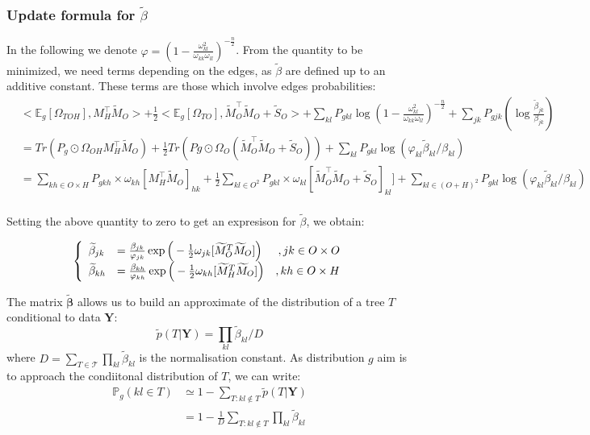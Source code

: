 \documentclass[11pt,a4paper]{article}
\newcommand{\betabf}{\boldsymbol{\beta}}
\newcommand{\Ybf}{\boldsymbol{Y}}
\newcommand{\Esp}{\mathds{E}}
\begin{document}
\subsubsection{Update formula for $\widetilde{\beta}$ }
In the following we denote  $\varphi = \left( 1-\frac{\omega_{kl}^2}{\omega_{kk}\omega_{ll}} \right)^{-\frac{n}{2}}$. From the quantity to be minimized, we need terms depending on the edges, as $\widetilde{\beta}$ are defined up to an additive constant. These terms are those  which involve edges probabilities:
\begin{align*}
& <\Esp_g[\Omega_{TOH}],M_H^\intercal \widetilde{M}_O> + \frac{1}{2}<\Esp_g[\Omega_{TO}],\widetilde{M}_O^\intercal \widetilde{M}_O + \widetilde{S}_O>+\sum _{kl} P_{gkl}  \log\left(1- \frac{ \omega_{kl}^2}{\omega_{kk}\omega_{ll}}\right)^{-\frac{n}{2}}   + \sum_{jk}P_{gjk} \left(\log \frac{\widetilde{\beta}_{jk}}{{\beta}_{jk}}\right)\\
&=Tr(P_g\odot\Omega_{OH}M_H^\intercal \widetilde{M}_O) + \frac{1}{2} Tr(Pg\odot \Omega_O (\widetilde{M}_O^\intercal \widetilde{M}_O + \widetilde{S}_O) ) + \sum_{kl} P_{gkl} \log \left( \varphi_{kl} \widetilde{\beta}_{kl}/\beta_{kl} \right)\\
&= \sum_{kh \in O\times H} P_{gkh} \times \omega_{kh} [M_H^\intercal \widetilde{M}_O]_{hk} + \frac{1}{2} \sum_{kl \in O^2} P_{gkl} \times \omega_{kl} [\widetilde{M}_O^\intercal \widetilde{M}_O + \widetilde{S}_O]_{kl}]+ \sum_{kl \in (O+H)^2} P_{gkl} \log \left( \varphi_{kl} \widetilde{\beta}_{kl}/\beta_{kl} \right) \\
\end{align*}
 
Setting the above quantity to zero to get an expresison for $\widetilde{\beta}$, we obtain:
 
\[\left\{\begin{array}{ll r}
\widetilde{\beta}_{jk} &= \frac{\beta_{jk}}{\varphi_{jk}}\exp\Big(-\frac{1}{2} \omega_{jk}[\widetilde{M}_O^T \widetilde{M}_O]\Big) & ,jk \in O\times O\\
\widetilde{\beta}_{kh} &=\frac{\beta_{kh}}{\varphi_{kh}}\exp\Big(-\frac{1}{2} \omega_{kh}[\widetilde{M}_H^T \widetilde{M}_O]\Big) & ,kh \in O\times H
\end{array}\right.\]
 

The matrix $\widetilde{\betabf}$ allows us to build an approximate of the distribution of a tree $T$ conditional to  data $\Ybf$:
$$\tilde{p}(T|\Ybf) = \prod_{kl} \widetilde{\beta}_{kl} \big/ D $$
where $D = \sum_{T\in \mathcal{T}}\prod_{kl} \widetilde{\beta}_{kl}$ is the normalisation constant. As distribution $g$ aim is to approach the condiitonal distribution of $T$, we can write:
\begin{align*}
\mathds{P}_g(kl \in T) &\simeq 1 - \sum_{T : kl \notin T}  \tilde{p}(T|\Ybf)\\
&= 1 - \frac{1}{D} \sum_{T : kl \notin T}\prod_{kl} \widetilde{\beta}_{kl}
\end{align*}
\end{document}
